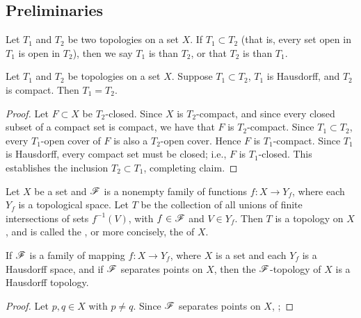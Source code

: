 \subsection{Preliminaries}
\begin{definition}
	Let $T_1$ and $T_2$ be two topologies on a set $X$. If $T_1 \subset T_2$ (that is, every set open in $T_1$ is open in $T_2$), then we say $T_1$ is  than $T_2$, or that $T_2$ is  than $T_1$.
\end{definition}

\begin{proposition}
	Let $T_1$ and $T_2$ be topologies on a set $X$. Suppose $T_1 \subset T_2$, $T_1$ is Hausdorff, and $T_2$ is compact. Then $T_1 = T_2$.
\end{proposition}
	\begin{proof}
		Let $F \subset X$ be $T_2$-closed. Since $X$ is $T_2$-compact, and since every closed subset of a compact set is compact, we have that $F$ is $T_2$-compact. Since $T_1 \subset T_2$, every $T_1$-open cover of $F$ is also a $T_2$-open cover. Hence $F$ is $T_1$-compact. Since $T_1$ is Hausdorff, every compact set must be closed; i.e., $F$ is $T_1$-closed. This establishes the inclusion $T_2 \subset T_1$, completing claim. 
	\end{proof}

\begin{definition}
	Let $X$ be a set and $\mathscr{F}$ is a nonempty family of functions $f:X \rightarrow Y_f$, where each $Y_f$ is a topological space. Let $T$ be the collection of all unions of finite intersections of sets $f^{-1}(V)$, with $f \in \mathscr{F}$ and $V \in Y_f$. Then $T$ is a topology on $X$, and is called the , or more concisely, the  of $X$.
\end{definition}

\begin{proposition}
	If $\mathscr{F}$ is a family of mapping $f:X \rightarrow Y_f$, where $X$ is a set and each $Y_f$ is a Hausdorff space, and if $\mathscr{F}$ separates points on $X$, then the $\mathscr{F}$-topology of $X$ is a Hausdorff topology.
\end{proposition}
	\begin{proof}
		Let $p,q \in X$ with $p \neq q$. Since $\mathscr{F}$ separates points on $X$, ;
	\end{proof}
